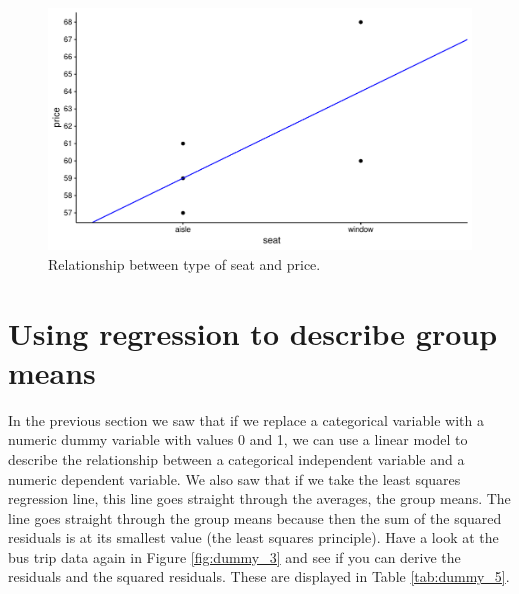 \documentclass[]{book}\usepackage[]{graphicx}\usepackage[]{color}
\makeatletter
\def\maxwidth{ %
  \ifdim\Gin@nat@width>\linewidth
    \linewidth
  \else
    \Gin@nat@width
  \fi
}
\newenvironment{knitrout}{}{} %
\makeatother
\begin{document}
\begin{knitrout}
\color{fgcolor}\begin{figure}

{\centering \includegraphics[width=\maxwidth]{figure/dummy_4-1} 

}

\caption[Relationship between type of seat and price]{Relationship between type of seat and price.}\label{fig:dummy_4}
\end{figure}


\end{knitrout}



\section{Using regression to describe group means}

In the previous section we saw that if we replace a categorical variable with a numeric dummy variable with values 0 and 1, we can use a linear model to describe the relationship between a categorical independent variable and a numeric dependent variable. We also saw that if we take the least squares regression line, this line goes straight through the averages, the group means. The line goes straight through the group means because then the sum of the squared residuals is at its smallest value (the least squares principle). Have a look at the bus trip data again in Figure \ref{fig:dummy_3} and see if you can derive the residuals and the squared residuals. These are displayed in Table \ref{tab:dummy_5}.
\end{document}
